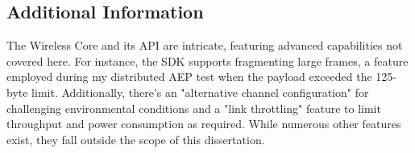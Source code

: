 \subsection{Additional Information}
The Wireless Core and its API are intricate, featuring advanced capabilities not covered here. For instance, the SDK supports fragmenting large frames, a feature employed during my distributed AEP test when the payload exceeded the 125-byte limit. Additionally, there's an "alternative channel configuration" for challenging environmental conditions and a "link throttling" feature to limit throughput and power consumption as required. While numerous other features exist, they fall outside the scope of this dissertation.

\newpage



